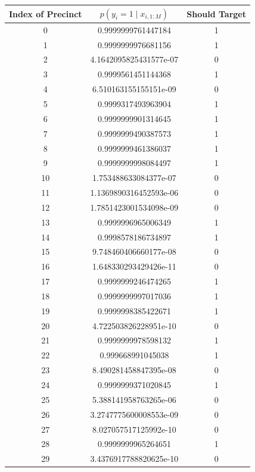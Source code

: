 \documentclass[12pt]{article}
\begin{document}
\begin{enumerate}[label=(\Alph*)]
\begin{enumerate}[label=(\roman*)]
			\begin{table}
				\small
				\centering
				\begin{tabular}{ |c|c|c| } 
					\hline
				    Index of Precinct & $p(y_{i} = 1 \mid x_{i, 1:M})$ & Should Target \\
					 \hline
					  0 & 0.9999999761447184 & 1 \\
						1 & 0.9999999976681156 & 1 \\
						2 & 4.1642095825431577e-07 & 0 \\
						3 & 0.9999561451144368 & 1 \\
						4 & 6.510163155155151e-09 & 0 \\
						5 & 0.9999317493963904 & 1 \\
						6 & 0.9999999901314645 & 1 \\
						7 & 0.9999999490387573 & 1 \\
						8 & 0.9999999461386037 & 1 \\
						9 & 0.9999999998084497 & 1 \\
						10 &  1.753488633084377e-07 & 0 \\
						11 &  1.1369890316452593e-06 & 0 \\
						12 &  1.7851423001534098e-09 & 0 \\
						13 &  0.9999996965006349 & 1 \\
						14 &  0.9998578186734897 & 1 \\
						15 &  9.748460406660177e-08 & 0 \\
						16 &  1.648330293429426e-11 & 0 \\
						17 &  0.9999999246474265 & 1 \\
						18 &  0.9999999997017036 & 1 \\
						19 &  0.9999998385422671 & 1 \\
						20 &  4.722503826228951e-10 & 0 \\
						21 &  0.9999999978598132 & 1 \\
						22 &  0.999668991045038 & 1 \\
						23 &  8.490281458847395e-08 & 0 \\
						24 &  0.9999999371020845 & 1 \\
						25 &  5.388141958763265e-06 & 0 \\
						26 &  3.2747775600008553e-09 & 0 \\
						27 &  8.027057517125992e-10 & 0 \\
						28 &  0.9999999965264651 & 1 \\
						29 &  3.4376917788820625e-10 & 0 \\

\end{tabular}
\end{table}
\end{enumerate}
\end{enumerate}
\end{document}
